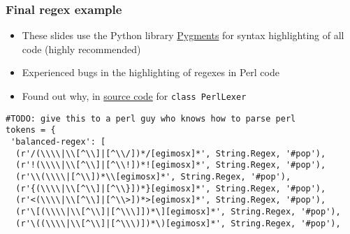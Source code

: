 \begin{frame}[fragile]
  \frametitle{Final regex example}

  \begin{itemize}
    \item These slides use the Python library \href{http://pygments.org/}{Pygments} for syntax highlighting of all code (highly recommended)
    \item Experienced bugs in the highlighting of regexes in Perl code
    \item Found out why, in \href{https://bitbucket.org/birkenfeld/pygments-main/src/7304e4759ae65343d89a51359ca538912519cc31/pygments/lexers/agile.py?at=default}{source code} for \texttt{class PerlLexer}
  \end{itemize}

  \begin{verbatim}
#TODO: give this to a perl guy who knows how to parse perl
tokens = {
 'balanced-regex': [
  (r'/(\\\\|\\[^\\]|[^\\/])*/[egimosx]*', String.Regex, '#pop'),
  (r'!(\\\\|\\[^\\]|[^\\!])*![egimosx]*', String.Regex, '#pop'),
  (r'\\(\\\\|[^\\])*\\[egimosx]*', String.Regex, '#pop'),
  (r'{(\\\\|\\[^\\]|[^\\}])*}[egimosx]*', String.Regex, '#pop'),
  (r'<(\\\\|\\[^\\]|[^\\>])*>[egimosx]*', String.Regex, '#pop'),
  (r'\[(\\\\|\\[^\\]|[^\\\]])*\][egimosx]*', String.Regex, '#pop'),
  (r'\((\\\\|\\[^\\]|[^\\\)])*\)[egimosx]*', String.Regex, '#pop'),

\end{verbatim}
\end{frame}
